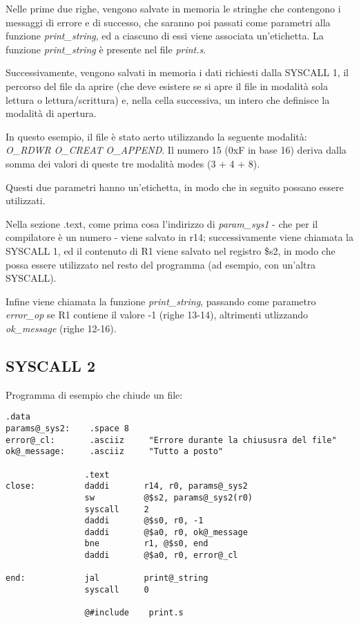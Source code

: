 \documentclass[letterpaper,10pt,italian]{sphinxmanual}
\begin{document}
Nelle prime due righe, vengono salvate in memoria le stringhe che contengono
i messaggi di errore e di successo, che saranno poi passati come parametri
alla funzione \emph{print\_string}, ed a ciascuno di essi viene associata
un'etichetta. La funzione \emph{print\_string} è presente nel file \emph{print.s}.

Successivamente, vengono salvati in memoria i dati richiesti dalla SYSCALL 1,
il percorso del file da aprire (che deve esistere se si apre il file in
modalità sola lettura o lettura/scrittura) e, nella cella successiva, un
intero che definisce la modalità di apertura.

In questo esempio, il file è stato aerto utilizzando la seguente modalità:
\emph{O\_RDWR} \textbar{} \emph{O\_CREAT} \textbar{} \emph{O\_APPEND}. Il numero 15 (0xF in base 16) deriva dalla
somma dei valori di queste tre modalità modes (3 + 4 + 8).

Questi due parametri hanno un'etichetta, in modo che in seguito possano essere
utilizzati.

Nella sezione .text, come prima cosa l'indirizzo di \emph{param\_sys1} - che per il
compilatore è un numero - viene salvato in r14; successivamente viene chiamata
la SYSCALL 1, ed il contenuto di R1 viene salvato nel registro \$s2, in modo
che possa essere utilizzato nel resto del programma (ad esempio, con un'altra
SYSCALL).

Infine viene chiamata la funzione \emph{print\_string}, passando come parametro
\emph{error\_op} se R1 contiene il valore -1 (righe 13-14), altrimenti utlizzando
\emph{ok\_message} (righe 12-16).


\subsection{SYSCALL 2}
\label{examples:syscall-2}
Programma di esempio che chiude un file:

\begin{Verbatim}[commandchars=@\[\]]
                .data
params@_sys2:    .space 8
error@_cl:       .asciiz     "Errore durante la chiususra del file"
ok@_message:     .asciiz     "Tutto a posto"

                .text
close:          daddi       r14, r0, params@_sys2
                sw          @$s2, params@_sys2(r0)
                syscall     2
                daddi       @$s0, r0, -1
                daddi       @$a0, r0, ok@_message
                bne         r1, @$s0, end
                daddi       @$a0, r0, error@_cl

end:            jal         print@_string
                syscall     0

                @#include    print.s
\end{Verbatim}
\end{document}
